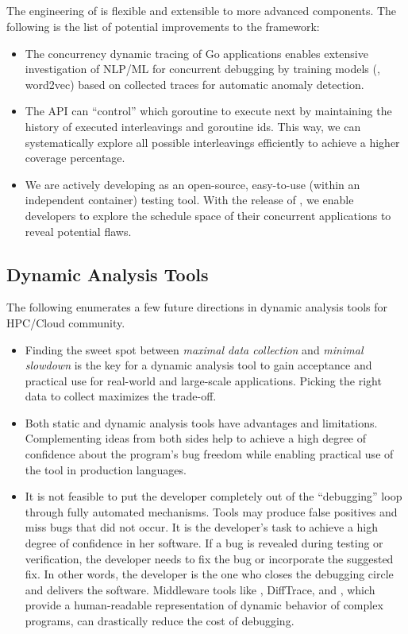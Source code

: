 \subsection{\goat}
The engineering of \goat is flexible and extensible to more advanced components. The following is the list of potential improvements to the framework:
\begin{itemize}
  \item The concurrency dynamic tracing of Go applications enables extensive investigation of NLP/ML for concurrent debugging by training models (\eg, word2vec) based on collected traces for automatic anomaly detection.
  \item The \goat API can ``control'' which goroutine to execute next by maintaining the history of executed interleavings and goroutine ids. This way, we can systematically explore all possible interleavings efficiently to achieve a higher coverage percentage.
  \item We are actively developing \goat as an open-source, easy-to-use (within an independent container) testing tool. With the release of \goat, we enable developers to explore the schedule space of their concurrent applications to reveal potential flaws.
\end{itemize}
\subsection{Dynamic Analysis Tools}
The following enumerates a few future directions in dynamic analysis tools for HPC/Cloud community.
\begin{itemize}
  \item Finding the sweet spot between \textit{maximal data collection} and \textit{minimal slowdown} is the key for a dynamic analysis tool to gain acceptance and practical use for real-world and large-scale applications. Picking the right data to collect maximizes the trade-off.
  \item Both static and dynamic analysis tools have advantages and limitations. Complementing ideas from both sides help to achieve a high degree of confidence about the program's bug freedom while enabling practical use of the tool in production languages.
  \item It is not feasible to put the developer completely out of the ``debugging'' loop through fully automated mechanisms. Tools may produce false positives and miss bugs that did not occur. It is the developer's task to achieve a high degree of confidence in her software. If a bug is revealed during testing or verification, the developer needs to fix the bug or incorporate the suggested fix. In other words, the developer is the one who closes the debugging circle and delivers the software. Middleware tools like \parlot, DiffTrace, and \goat, which provide a human-readable representation of dynamic behavior of complex programs, can drastically reduce the cost of debugging.
\end{itemize}
